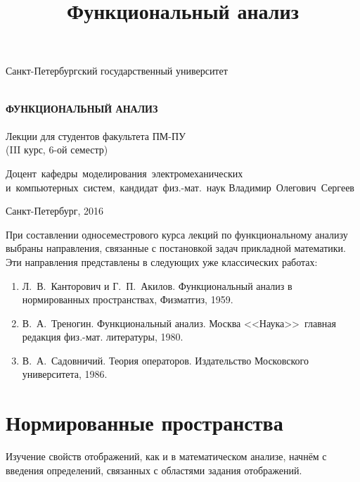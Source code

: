 \documentclass[12pt,a4paper,titlepage,oneside]{book}
\title{Функциональный анализ}
\theoremstyle{definition}
\theoremstyle{plain}
\theoremstyle{break}
\theoremstyle{remark}
\theoremstyle{remark}
\theoremstyle{remark}
\theoremstyle{remark}
\theoremstyle{plain}
\theoremstyle{plain}
\begin{document}
\begin{titlepage}
\begin{center}

\vfill

Санкт-Петербургский государственный университет\\
\ \\

\vfill

{\large\bf ФУНКЦИОНАЛЬНЫЙ АНАЛИЗ\\}
\ \\
Лекции для студентов факультета ПМ-ПУ\\
(III курс, 6-ой семестр)

\vfill

\hfill\vbox
{
\hbox{Доцент кафедры моделирования электромеханических}
\hbox{и компьютерных систем, кандидат физ.-мат. наук}
\hbox{Владимир Олегович Сергеев}
}

\vfill

Санкт-Петербург, 2016
\end{center}
\end{titlepage}

\tableofcontents

\vfill

\begin{small}
При составлении односеместрового курса лекций по функциональному анализу выбраны направления, связанные с постановкой задач прикладной математики. Эти направления представлены в следующих уже классических работах:
\begin{enumerate}
    \item Л.~В.~Канторович и Г.~П.~Акилов. Функциональный анализ в нормированных пространствах, Физматгиз, 1959.
    \item В.~А.~Треногин. Функциональный анализ. Москва <<Наука>>\, главная редакция физ.-мат. литературы, 1980.
    \item В.~А.~Садовничий. Теория операторов. Издательство Московского университета, 1986.
\end{enumerate}
\end{small}

\chapter{Нормированные пространства}

Изучение свойств отображений, как и в математическом анализе, начнём с введения определений, связанных с областями задания отображений.
\end{document}
